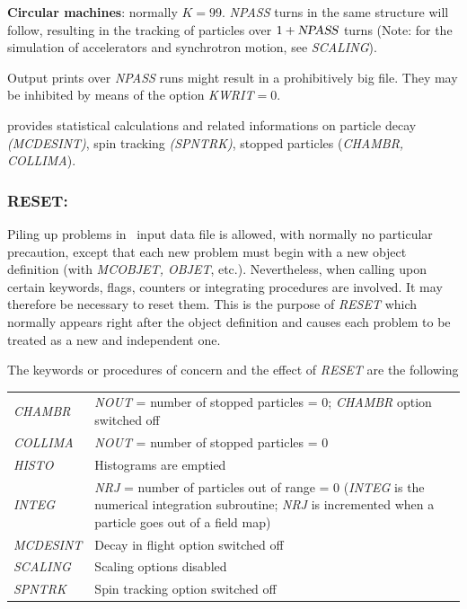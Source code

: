 \noindent\textbf{Circular machines}: normally $ K=99$.  \textsl{NPASS} turns in
the same structure will follow, resulting in the tracking of \IMAX 
particles over $1+\text{\textsl{NPASS}}$ turns (Note: for the simulation of 
accelerators and synchrotron motion, see \textsl{SCALING}). 
\bigskip

\noindent Output prints over \textsl{NPASS} runs might result in a
prohibitively big file. They may be inhibited by means of the option 
\mbox{\textsl{KWRIT}$= 0$}.  
\bigskip

\noindent\REBELOTE provides statistical calculations and related 
informations on particle decay \textsl{(MCDESINT)}, spin tracking  
\textsl{(SPNTRK)}, stopped particles (\textsl{CHAMBR,
 COLLIMA}). 
 \newpage

\subsubsection*{RESET: \RESETTitl}  \label{RESET} 

 Piling up problems in \zgou\ input data file is allowed, with 
normally no particular precaution, except that each new problem 
must begin with a new object definition (with \textsl{MCOBJET, OBJET}, 
etc.). Nevertheless, when calling upon certain keywords, flags, 
counters or integrating procedures are involved. 
It may therefore be necessary to reset them. This is the purpose 
of \textsl{RESET} which normally appears right after the object definition 
and causes each problem to be treated as a new and 
independent one.  
\bigskip

\noindent The keywords or procedures of concern and the effect of 
\textsl{RESET} are the following 
\bigskip

\begin{tabular}{>{\sl}l!{:}p{13cm}}
  CHAMBR 
       & \textsl{NOUT} = number of stopped particles = 0;  \textsl{CHAMBR} option  switched  off \\
  COLLIMA 
       & \textsl{NOUT} = number of stopped particles = 0\\
  HISTO 
       &  Histograms are emptied\\
  INTEG 
       & \textsl{NRJ} = number of particles out of range = 0 (\textsl{INTEG} is the numerical 
           integration subroutine; \textsl{NRJ} is incremented when a particle 
            goes out of a field map)\\
   MCDESINT 
       & Decay in flight option switched off \\
  SCALING 
       &  Scaling options disabled\\
  SPNTRK 
       & Spin tracking option switched off
\end{tabular}
 \newpage

